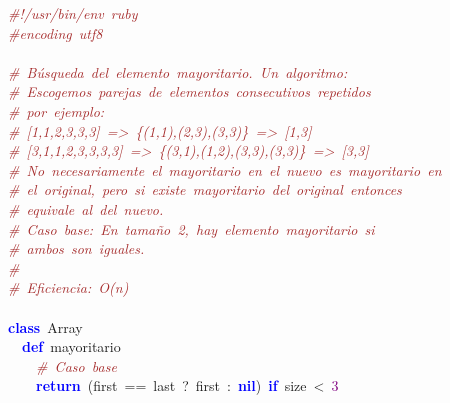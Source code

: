 \noindent
\mbox{}\textit{\textcolor{Brown}{\#!/usr/bin/env\ ruby}} \\
\mbox{}\textit{\textcolor{Brown}{\#encoding\ utf8}} \\
\mbox{} \\
\mbox{}\textit{\textcolor{Brown}{\#\ Búsqueda\ del\ elemento\ mayoritario.\ Un\ algoritmo:}} \\
\mbox{}\textit{\textcolor{Brown}{\#\ Escogemos\ parejas\ de\ elementos\ consecutivos\ repetidos}} \\
\mbox{}\textit{\textcolor{Brown}{\#\ por\ ejemplo:}} \\
\mbox{}\textit{\textcolor{Brown}{\#\ [1,1,2,3,3,3]\ =\textgreater{}\ \{(1,1),(2,3),(3,3)\}\ =\textgreater{}\ [1,3]}} \\
\mbox{}\textit{\textcolor{Brown}{\#\ [3,1,1,2,3,3,3,3]\ =\textgreater{}\ \{(3,1),(1,2),(3,3),(3,3)\}\ =\textgreater{}\ [3,3]}} \\
\mbox{}\textit{\textcolor{Brown}{\#\ No\ necesariamente\ el\ mayoritario\ en\ el\ nuevo\ es\ mayoritario\ en}} \\
\mbox{}\textit{\textcolor{Brown}{\#\ el\ original,\ pero\ si\ existe\ mayoritario\ del\ original\ entonces}} \\
\mbox{}\textit{\textcolor{Brown}{\#\ equivale\ al\ del\ nuevo.}} \\
\mbox{}\textit{\textcolor{Brown}{\#\ Caso\ base:\ En\ tamaño\ 2,\ hay\ elemento\ mayoritario\ si}} \\
\mbox{}\textit{\textcolor{Brown}{\#\ ambos\ son\ iguales.}} \\
\mbox{}\textit{\textcolor{Brown}{\#}} \\
\mbox{}\textit{\textcolor{Brown}{\#\ Eficiencia:\ O(n)}} \\
\mbox{} \\
\mbox{}\textbf{\textcolor{Blue}{class}}\ Array \\
\mbox{}\ \ \textbf{\textcolor{Blue}{def}}\ mayoritario \\
\mbox{}\ \ \ \ \textit{\textcolor{Brown}{\#\ Caso\ base}} \\
\mbox{}\ \ \ \ \textbf{\textcolor{Blue}{return}}\ \textcolor{BrickRed}{(}first\ \textcolor{BrickRed}{==}\ last\ \textcolor{BrickRed}{?}\ first\ \textcolor{BrickRed}{:}\ \textbf{\textcolor{Blue}{nil}}\textcolor{BrickRed}{)}\ \textbf{\textcolor{Blue}{if}}\ size\ \textcolor{BrickRed}{\textless{}}\ \textcolor{Purple}{3} \\
\mbox{}\ \ \ \  \\
